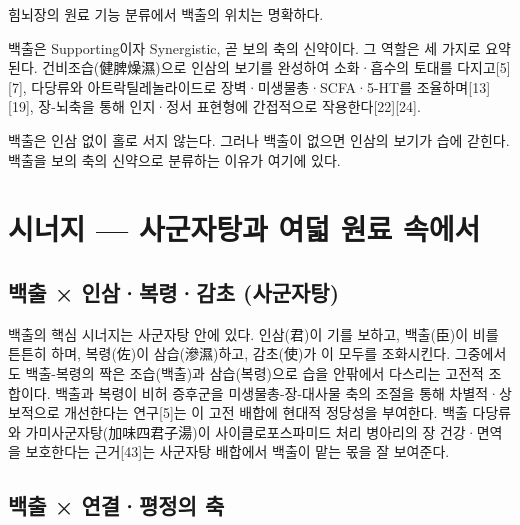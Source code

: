 \documentclass[12pt,oneside]{book}
\begin{document}
힘뇌장의 원료 기능 분류에서 백출의 위치는 명확하다.

\vspace{2pt}\vspace{3pt}

백출은 Supporting이자 Synergistic, 곧 보의 축의 신약이다. 그 역할은 세 가지로 요약된다. 건비조습(健脾燥濕)으로 인삼의 보기를 완성하여 소화·흡수의 토대를 다지고[5][7], 다당류와 아트락틸레놀라이드로 장벽·미생물총·SCFA·5-HT를 조율하며[13][19], 장-뇌축을 통해 인지·정서 표현형에 간접적으로 작용한다[22][24].

백출은 인삼 없이 홀로 서지 않는다. 그러나 백출이 없으면 인삼의 보기가 습에 갇힌다. 백출을 보의 축의 신약으로 분류하는 이유가 여기에 있다.

\section{시너지 — 사군자탕과 여덟 원료 속에서}

\subsection{백출 × 인삼·복령·감초 (사군자탕)}

백출의 핵심 시너지는 사군자탕 안에 있다. 인삼(君)이 기를 보하고, 백출(臣)이 비를 튼튼히 하며, 복령(佐)이 삼습(滲濕)하고, 감초(使)가 이 모두를 조화시킨다. 그중에서도 백출-복령의 짝은 조습(백출)과 삼습(복령)으로 습을 안팎에서 다스리는 고전적 조합이다. 백출과 복령이 비허 증후군을 미생물총-장-대사물 축의 조절을 통해 차별적·상보적으로 개선한다는 연구[5]는 이 고전 배합에 현대적 정당성을 부여한다. 백출 다당류와 가미사군자탕(加味四君子湯)이 사이클로포스파미드 처리 병아리의 장 건강·면역을 보호한다는 근거[43]는 사군자탕 배합에서 백출이 맡는 몫을 잘 보여준다.

\subsection{백출 × 연결·평정의 축}
\end{document}
